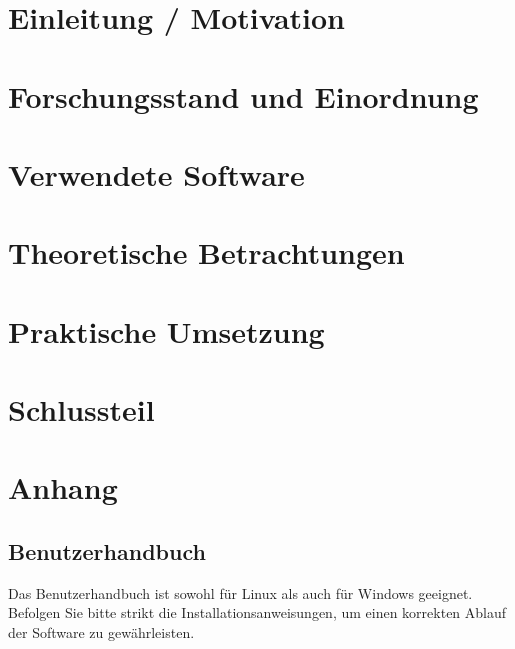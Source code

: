 \documentclass[12pt]{scrreprt}
\theoremstyle{remark}
\begin{document}
\pagestyle{plain}

\singlespacing
\tableofcontents

\onehalfspacing

\chapter{Einleitung / Motivation}
\label{chap:introduction}


\chapter{Forschungsstand und Einordnung}
\label{chap:forschung}


\chapter{Verwendete Software}
\label{chap:software}


\chapter{Theoretische Betrachtungen}
\label{chap:theorie}



\chapter{Praktische Umsetzung}
\label{chap:praxis}


\chapter{Schlussteil}
\label{chap:ausblick}


%
\printbibliography

\chapter{Anhang}
\section{Benutzerhandbuch} 

Das Benutzerhandbuch ist sowohl für Linux als auch für Windows geeignet. Befolgen Sie bitte strikt die Installationsanweisungen, um einen korrekten Ablauf der Software zu gewährleisten.\\
\end{document}
